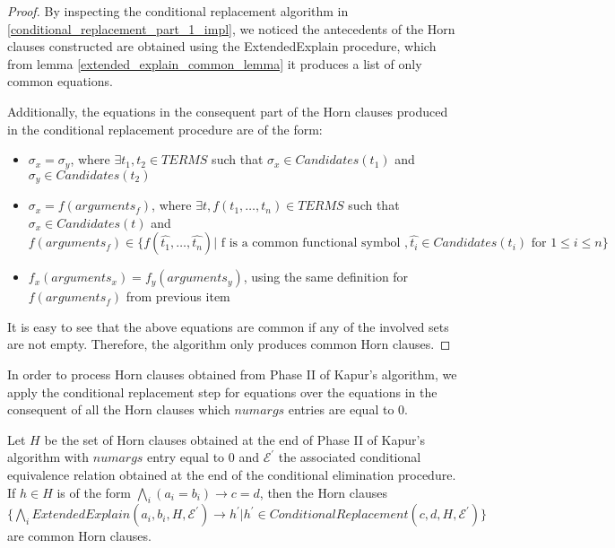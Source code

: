 \begin{proof}
  By inspecting the conditional replacement algorithm 
  in \ref{conditional_replacement_part_1_impl},
  we noticed the antecedents of the Horn clauses 
  constructed are obtained using the ExtendedExplain 
  procedure, which from lemma \ref{extended_explain_common_lemma} 
  it produces a list of only common equations.

  Additionally, the equations in the consequent part 
  of the Horn clauses produced in the conditional replacement 
  procedure are of the form:
  
  \begin{itemize}
      \item $\sigma_x = \sigma_y$, 
        where $\exists t_1, t_2 \in TERMS$
        such that $\sigma_x \in Candidates(t_1)$ and 
        $\sigma_y \in Candidates(t_2)$
      \item $\sigma_x = f(arguments_{f})$, 
        where $\exists t, f(t_1, \dots, t_n) \in TERMS$
        such that $\sigma_x \in Candidates(t)$ and
        $f(arguments_f) \in \{f(\hat{t_1}, \dots, \hat{t_n})
          | \text{ f is a common functional symbol },
          \hat{t_i} \in Candidates(t_i) \text{ for } 1 \leq i \leq n
        \}$
      \item $f_x(arguments_x) = f_y(arguments_y)$, using the same
        definition for $f(arguments_f)$ from previous item
  \end{itemize}

  It is easy to see that the above equations are common if any
  of the involved sets are not empty. Therefore, the algorithm 
  only produces common Horn clauses.
\end{proof}

In order to process Horn clauses obtained 
from Phase II of Kapur's algorithm, we apply 
the conditional replacement step for equations
over the equations in the consequent of all 
the Horn clauses which $numargs$ entries are 
equal to 0.

\begin{lemma}
  Let $H$ be the set of Horn clauses
  obtained at the end of Phase II of Kapur's 
  algorithm with $numargs$ entry equal to 0 
  and $\mathcal{E^{'}}$ the associated
  conditional equivalence relation obtained 
  at the end of the conditional elimination 
  procedure. 
  If $h \in H$ is of the form $\bigwedge_i (a_i = b_i) 
  \rightarrow c = d$, then the Horn clauses
  $\{\bigwedge_i ExtendedExplain(a_i, b_i, H, \mathcal{E^{'}})
    \rightarrow h^{'}  | 
    h^{'} \in 
ConditionalReplacement(c, d, H, \mathcal{E^{'}})\}$
are common Horn clauses.
\end{lemma}

